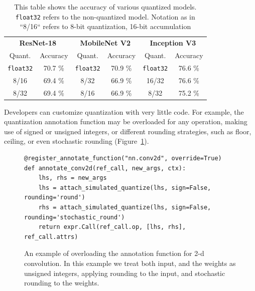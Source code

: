   \begin{table}
    \begin{tabular}{|c|c||c|c||c|c|}
      \hline
      \multicolumn{2}{|c}{\textbf{ResNet-18}} & \multicolumn{2}{c}{\textbf{MobileNet V2}} & \multicolumn{2}{c|}{\textbf{Inception V3}} \\
      \multicolumn{1}{|c}{Quant.}    & \multicolumn{1}{c}{Accuracy}   &  \multicolumn{1}{c}{Quant.}  & \multicolumn{1}{c}{Accuracy}  & \multicolumn{1}{c}{Quant.}  & \multicolumn{1}{c|}{Accuracy} \\
      \hline
      \texttt{float32} & 70.7 \%    & \texttt{float32} & 70.9 \%       & \texttt{float32} & 76.6 \% \\
      8/16         & 69.4 \%    & 8/32         & 66.9 \%       & 16/32        & 76.6 \% \\
      8/32         & 69.4 \%    & 8/16         & 66.9 \%       & 8/32         & 75.2 \% \\
      \hline
    \end{tabular}
    \caption{This table shows the accuracy of various quantized models.
      \texttt{float32} refers to the non-quantized model.
      Notation as in ``8/16`` refers to 8-bit quantization,
      16-bit accumulation}
    \label{fig:quant_results}
  \end{table}
Developers can customize quantization with very little code.
For example, the quantization annotation function may be overloaded for any operation,
  making use of signed or unsigned integers, or different rounding strategies, such as
  floor, ceiling, or even stochastic rounding (Figure~\ref{fig:annotate_conv}).
\begin{figure}
\begin{verbatim}
@register_annotate_function("nn.conv2d", override=True)
def annotate_conv2d(ref_call, new_args, ctx):
    lhs, rhs = new_args
    lhs = attach_simulated_quantize(lhs, sign=False, rounding='round')
    rhs = attach_simulated_quantize(lhs, sign=False, rounding='stochastic_round')
    return expr.Call(ref_call.op, [lhs, rhs], ref_call.attrs)
\end{verbatim}
\caption{
  An example of overloading the annotation function for 2-d convolution.
  In this example we treat both input, and the weights as unsigned integers,
  applying rounding to the input, and stochastic rounding to the weights.}
\label{fig:annotate_conv}
\end{figure}
